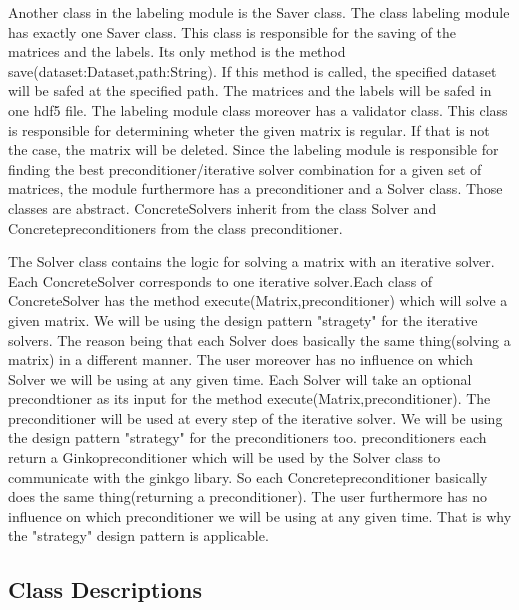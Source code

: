 \documentclass[parskip=full]{scrartcl}
\begin{document}
Another class in the labeling module is the Saver class. The class labeling module has exactly one Saver class. This class is responsible for the saving of the matrices and the \glspl{label}. Its only method is the method save(dataset:Dataset,path:String). If this method is called, the specified dataset will be safed at the specified path. The matrices and the \glspl{label} will be safed in one hdf5 file.\newline
\newline
The labeling module class moreover has a validator class. This class is responsible for determining wheter the given matrix is regular. If that is not the case, the matrix will be deleted.
\newline\newline
Since the labeling module is responsible for finding the best \gls{preconditioner}/\gls{iterative solver} combination for a given set of matrices, the module furthermore has a \gls{preconditioner} and a Solver class. Those classes are abstract. ConcreteSolvers inherit from the class Solver and Concrete\gls{preconditioner}s from the class \gls{preconditioner}.\newline\newline

The Solver class contains the logic for solving a matrix with an \gls{iterative solver}. Each ConcreteSolver corresponds to one \gls{iterative solver}.Each class of ConcreteSolver has the method execute(Matrix,\gls{preconditioner}) which will solve a given matrix. We will be using the design pattern "stragety" for the \gls{iterative solver}s. The reason being that each Solver does basically the same thing(solving a matrix) in a different manner. The user moreover has no influence on which Solver we will be using at any given time.
Each Solver will take an optional precondtioner as its input for the method execute(Matrix,\gls{preconditioner}). The \gls{preconditioner} will be used at every step of the \gls{iterative solver}. We will be using the design pattern "\gls{strategy}" for the \gls{preconditioner}s too. \gls{preconditioner}s each return a Ginko\gls{preconditioner} which will be used by the Solver class to communicate with the ginkgo libary. So each Concrete\gls{preconditioner} basically does the same thing(returning a \gls{preconditioner}). The user furthermore has no influence on which \gls{preconditioner} we will be using at any given time. That is why the "\gls{strategy}" design pattern is applicable.

\subsection{Class Descriptions}
\end{document}
